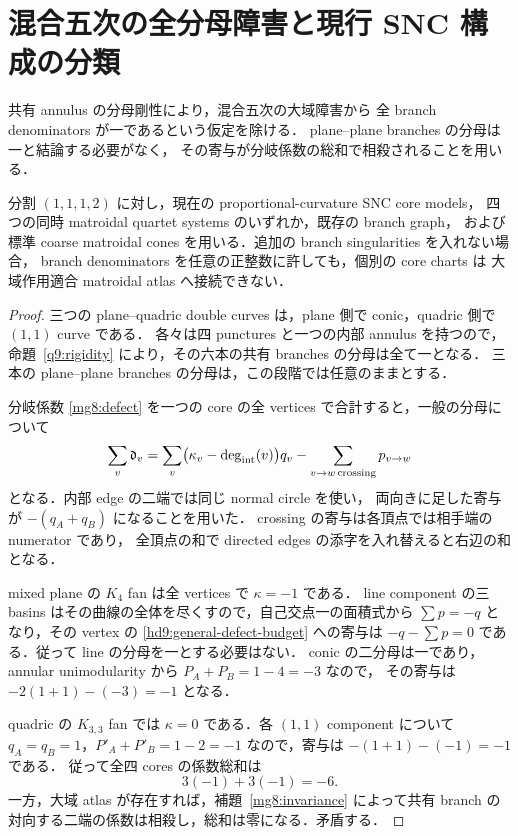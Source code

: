 \section{混合五次の全分母障害と現行 SNC 構成の分類}
\label{hd9:section}

共有 annulus の分母剛性により，混合五次の大域障害から
全 branch denominators が一であるという仮定を除ける．
plane--plane branches の分母は一と結論する必要がなく，
その寄与が分岐係数の総和で相殺されることを用いる．

\begin{theorem}[混合五次の高分母を含む大域障害]\label{hd9:mixed-no-go}
分割 $(1,1,1,2)$ に対し，現在の proportional-curvature SNC core models，
四つの同時 matroidal quartet systems のいずれか，既存の branch graph，
および標準 coarse matroidal cones を用いる．追加の branch singularities を入れない場合，
branch denominators を任意の正整数に許しても，個別の core charts は
大域作用適合 matroidal atlas へ接続できない．
\end{theorem}

\begin{proof}
三つの plane--quadric double curves は，plane 側で conic，quadric 側で $(1,1)$ curve である．
各々は四 punctures と一つの内部 annulus を持つので，
命題~\ref{q9:rigidity} により，その六本の共有 branches の分母は全て一となる．
三本の plane--plane branches の分母は，この段階では任意のままとする．

分岐係数 \eqref{mg8:defect} を一つの core の全 vertices で合計すると，一般の分母について
\begin{equation}\label{hd9:general-defect-budget}
 \sum_v\mathfrak d_v
 =\sum_v\bigl(\kappa_v-\deg_{\rm int}(v)\bigr)q_v
 -\sum_{v\to w\,\mathrm{crossing}}p_{v\to w}
\end{equation}
となる．内部 edge の二端では同じ normal circle を使い，
両向きに足した寄与が $-(q_A+q_B)$ になることを用いた．
crossing の寄与は各頂点では相手端の numerator であり，
全頂点の和で directed edges の添字を入れ替えると右辺の和となる．

mixed plane の $K_4$ fan は全 vertices で $\kappa=-1$ である．
line component の三 basins はその曲線の全体を尽くすので，自己交点一の面積式から
$\sum p=-q$ となり，その vertex の \eqref{hd9:general-defect-budget} への寄与は
$-q-\sum p=0$ である．従って line の分母を一とする必要はない．
conic の二分母は一であり，annular unimodularity から $P_A+P_B=1-4=-3$ なので，
その寄与は $-2(1+1)-(-3)=-1$ となる．

quadric の $K_{3,3}$ fan では $\kappa=0$ である．各 $(1,1)$ component について
$q_A=q_B=1$，$P'_A+P'_B=1-2=-1$ なので，寄与は $-(1+1)-(-1)=-1$ である．
従って全四 cores の係数総和は
\[
 3(-1)+3(-1)=-6.
\]
一方，大域 atlas が存在すれば，補題~\ref{mg8:invariance} によって共有 branch の
対向する二端の係数は相殺し，総和は零になる．矛盾する．
\end{proof}

